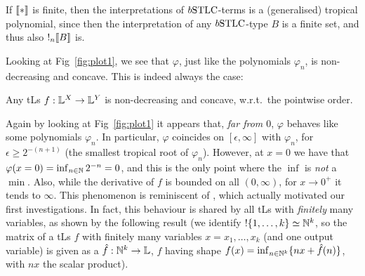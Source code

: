 If $\llbracket*\rrbracket$ is finite, then the interpretations of $\BSTLC$-terms is a (generalised) tropical polynomial, since then the interpretation of any $\BSTLC$-type $B$ is a finite set, and thus also $!_n \llbracket B\rrbracket$ is.
% 

Looking at Fig~\ref{fig:plot1}, we see that $\varphi$, just like the polynomials $\varphi_{n}$, is non-decreasing and concave.
This is indeed always the case:

\begin{proposition}\label{prop:nondecr+conc}
 Any tLs $f:\mathbb{L}^X\to\mathbb{L}^Y$ is non-decreasing and concave, w.r.t.\ the pointwise order.
\end{proposition}

Again by looking at Fig~\ref{fig:plot1} it appears that, \emph{far from $0$}, $\varphi$ behaves like some polynomials $\varphi_{n}$.
In particular, %
$\varphi$ coincides on $[\epsilon,\infty]$ with $\varphi_{n}$,
for $\epsilon \geq 2^{-(n+1)}$ (the smallest tropical root of $\varphi_{n}$).
However, at
%
 $x=0$ we have that $\varphi(x=0)=\inf_{n\in\mathbb{N}} 2^{-n}=0$, and this is the only point where the $\inf$ is \emph{not} a $\min$.
Also, while the derivative of $f$ is bounded on all $(0,\infty)$, for $x\to 0^+$ it tends to $\infty$.
This phenomenon is reminiscent of \cite[Example 7]{Ehrhard2005},
which actually motivated our first investigations.
In fact, this behaviour is shared by all tLs with \emph{finitely} many variables, as shown by the following result (we identify $!\{1,\dots,k\}\simeq \mathbb{N}^k$, so the matrix of a tLs $f$ with finitely many variables $x=x_1,\dots,x_k$ (and one output variable) is given as a $\hat{f}:\mathbb{N}^k\to\mathbb{L}$, $f$ having shape $f(x)=\inf_{n\in \mathbb{N}^k}\{nx+\hat{f}(n)\}$, with $nx$ the scalar product).


